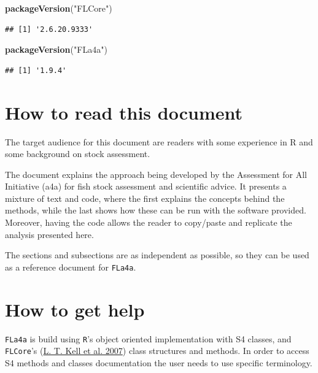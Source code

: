\documentclass[
]{book}
\newenvironment{Shaded}{\begin{snugshade}}{\end{snugshade}}
\newcommand{\FunctionTok}[1]{\textcolor[rgb]{0.13,0.29,0.53}{\textbf{#1}}}
\newcommand{\NormalTok}[1]{#1}
\newcommand{\StringTok}[1]{\textcolor[rgb]{0.31,0.60,0.02}{#1}}
\begin{document}
\begin{Shaded}
\begin{Highlighting}[]
\FunctionTok{packageVersion}\NormalTok{(}\StringTok{"FLCore"}\NormalTok{)}
\end{Highlighting}
\end{Shaded}

\begin{verbatim}
## [1] '2.6.20.9333'
\end{verbatim}

\begin{Shaded}
\begin{Highlighting}[]
\FunctionTok{packageVersion}\NormalTok{(}\StringTok{"FLa4a"}\NormalTok{)}
\end{Highlighting}
\end{Shaded}

\begin{verbatim}
## [1] '1.9.4'
\end{verbatim}

\hypertarget{how-to-read-this-document}{%
\section{How to read this document}\label{how-to-read-this-document}}

The target audience for this document are readers with some experience in R and some background on stock assessment.

The document explains the approach being developed by the Assessment for All Initiative (a4a) for fish stock assessment and scientific advice. It presents a mixture of text and code, where the first explains the concepts behind the methods, while the last shows how these can be run with the software provided. Moreover, having the code allows the reader to copy/paste and replicate the analysis presented here.

The sections and subsections are as independent as possible, so they can be used as a reference document for \texttt{FLa4a}.

\hypertarget{how-to-get-help}{%
\section{How to get help}\label{how-to-get-help}}

\texttt{FLa4a} is build using \texttt{R}'s object oriented implementation with S4 classes, and \texttt{FLCore}'s (\protect\hyperlink{ref-flr}{L. T. Kell et al. 2007}) class structures and methods. In order to access S4 methods and classes documentation the user needs to use specific terminology.
\end{document}
